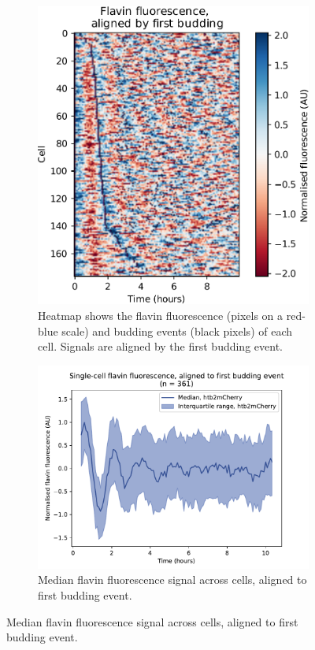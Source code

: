 \begin{figure}
  \centering
  \begin{subfigure}[htpb]{0.4\textwidth}
   \centering
   \includegraphics[width=\textwidth]{heatmap_edit.pdf}
   \caption{
     Heatmap shows the flavin fluorescence (pixels on a red-blue scale) and budding events (black pixels) of each cell.
     Signals are aligned by the first budding event.
   }
   \label{fig:biology-highglc-sync-heatmap}
  \end{subfigure}%
  \begin{subfigure}[htpb]{0.4\textwidth}
   \centering
   \includegraphics[width=\textwidth]{htb2mCherry_26643_6}
   \caption{
    Median flavin fluorescence signal across cells, aligned to first budding event.
   }
   \label{fig:biology-highglc-sync-median}
  \end{subfigure}


\end{figure}
